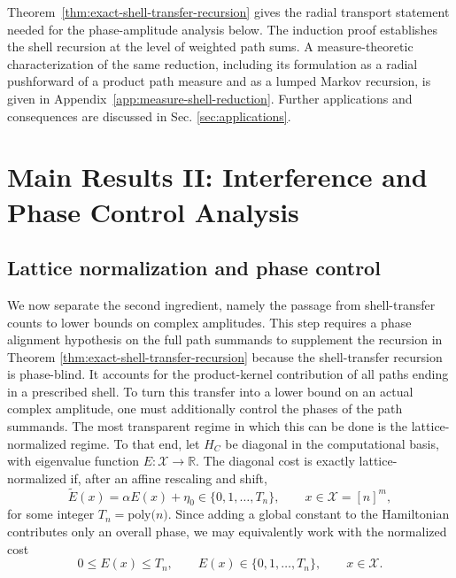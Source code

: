 \documentclass[a4paper,onecolumn,11pt,unpublished]{quantumarticle}
\newcommand{\poly}[1]{\mathrm{poly}\bigl(#1\bigr)}
\theoremstyle{remark}
\begin{document}
\noindent
Theorem~\ref{thm:exact-shell-transfer-recursion} gives the radial transport statement needed for the phase-amplitude analysis below. The induction proof establishes the shell recursion at the level of weighted path sums. A measure-theoretic characterization of the same reduction, including its formulation as a radial pushforward of a product path measure and as a lumped Markov recursion, is given in Appendix~\ref{app:measure-shell-reduction}. Further applications and consequences are discussed in Sec. \ref{sec:applications}.











\section{Main Results II: Interference and  Phase Control Analysis}
\label{sec:main2}


\subsection{Lattice normalization and phase control}
\label{subsec:shell-transfer-to-amplitude}

We now separate the second ingredient, namely the passage from  
shell-transfer counts to lower bounds on complex amplitudes. This step requires a phase alignment hypothesis on the full path summands to supplement the recursion in Theorem \ref{thm:exact-shell-transfer-recursion} because the shell-transfer recursion is phase-blind. It accounts for the   product-kernel contribution of all paths ending in a prescribed shell. To turn this   transfer into a lower bound on an actual complex amplitude, one must additionally control the phases of the path summands. The most transparent regime in which this can be done is the lattice-normalized regime. To that end, let \(H_C\) be diagonal in the computational basis, with eigenvalue function \(E:\mathcal X\to\mathbb R\). The diagonal cost is exactly
lattice-normalized if, after an affine rescaling and shift,
\begin{equation}
\label{eq:lattice-normalized-cost}
\widetilde E(x)=\alpha E(x)+\eta_0 \in \{0,1,\dots,T_n\},
\qquad x\in \mathcal X=[n]^m,
\end{equation}
for some integer \(T_n=\poly n\). Since adding a global constant to the Hamiltonian contributes only an overall phase, we may equivalently work with the normalized cost
\begin{equation}
\label{eq:lattice-normalized-cost-range}
0\le E(x)\le T_n,
\qquad
E(x)\in\{0,1,\dots,T_n\},
\qquad x\in \mathcal X.
\end{equation}
\end{document}
